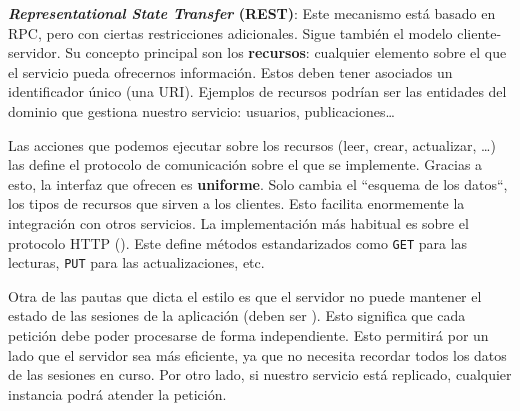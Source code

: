 \textbf{\emph{Representational State Transfer} (REST)}: Este mecanismo está basado en RPC, pero con ciertas restricciones adicionales. \cite{taylorSoftwareArchitectureFoundations2009} Sigue también el modelo cliente-servidor. Su concepto principal son los \textbf{recursos}: cualquier elemento sobre el que el servicio pueda ofrecernos información. Estos deben tener asociados un identificador único (una URI). \cite{richardsonRESTfulWebServices2007} Ejemplos de recursos podrían ser las entidades del dominio que gestiona nuestro servicio: usuarios, publicaciones\dots

Las acciones que podemos ejecutar sobre los recursos (leer, crear, actualizar, \dots) las define el protocolo de comunicación sobre el que se implemente. Gracias a esto, la interfaz que ofrecen es \textbf{uniforme}. Solo cambia el ``esquema de los datos``, los tipos de recursos que sirven a los clientes. Esto facilita enormemente la integración con otros servicios. \cite{nallyRESTVsRPC2018} La implementación más habitual es sobre el protocolo HTTP (). Este define métodos estandarizados como \texttt{GET} para las lecturas, \texttt{PUT} para las actualizaciones, etc.

Otra de las pautas que dicta el estilo es que el servidor no puede mantener el estado de las sesiones de la aplicación (deben ser \textbf{}). Esto significa que cada petición debe poder procesarse de forma independiente. Esto permitirá por un lado que el servidor sea más eficiente, ya que no necesita recordar todos los datos de las sesiones en curso. Por otro lado, si nuestro servicio está replicado, cualquier instancia podrá atender la petición.

